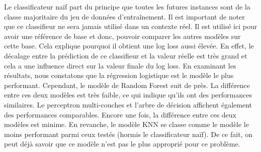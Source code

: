 \documentclass[12pt]{article}
\begin{document}
Le classificateur naïf part du principe que toutes les futures instances sont de la classe majoritaire du jeu de données d'entraînement. 
Il est important de noter que ce classifieur ne sera jamais utilisé dans un contexte réel.
Il est utilisé ici pour avoir une référence de base et donc, pouvoir comparer les autres modèles sur cette base.
Cela explique pourquoi il obtient une log loss aussi élevée.
En effet, le décalage entre la prédiction de ce classifieur et la valeur réelle est très grand et cela a une influence direct sur la valeur finale du log loss.
\newline\newline 
En examinant les résultats, nous constatons que la régression logistique est le modèle le plus performant. 
Cependant, le modèle de Random Forest suit de près. 
La différence entre ces deux modèles est très faible, ce qui indique qu'ils ont des performances similaires.
\newline\newline
Le perceptron multi-couches et l'arbre de décision affichent également des performances comparables. 
Encore une fois, la différence entre ces deux modèles est minime.
\newline\newline
En revanche, le modèle KNN se classe comme le modèle le moins performant parmi ceux testés (hormis le classificateur naïf). 
De ce fait, on peut déjà savoir que ce modèle n'est pas le plus approprié pour ce problème.
\end{document}
